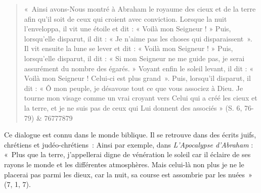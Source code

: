 \begin{quote}
    «~Ainsi avons-Nous montré à Abraham le royaume des cieux et de la terre
afin qu'il soit de ceux qui croient avec conviction. Lorsque la nuit
l'enveloppa, il vit une étoile et dit : « Voilà mon Seigneur ! » Puis,
lorsqu'elle disparut, il dit : « Je n'aime pas les choses qui
disparaissent~». Il vit ensuite la lune se lever et dit : « Voilà mon
Seigneur ! » Puis, lorsqu'elle disparut, il dit : « Si mon Seigneur ne
me guide pas, je serai assurément du nombre des égarés. » Voyant enfin
le soleil levant, il dit : « Voilà mon Seigneur ! Celui-ci est plus
grand~». Puis, lorsqu'il disparut, il dit : « Ô mon peuple, je désavoue
tout ce que vous associez à Dieu. Je tourne mon visage comme un vrai
croyant vers Celui qui a créé les cieux et la terre, et je ne suis pas
de ceux qui Lui donnent des associés » (S. 6, 76-79) & 76777879 \\

\end{quote}
Ce dialogue est connu dans le monde biblique. Il se retrouve dans des
écrits juifs, chrétiens et judéo-chrétiens~: Ainsi par exemple, dans
\emph{L'Apocalypse d'Abraham} : «~Plus que la terre, j'appellerai digne de
vénération le soleil car il éclaire de ses rayons le monde et les
différentes atmosphères. Mais celui-là non plus je ne le placerai pas
parmi les dieux, car la nuit, sa course est assombrie par les nuées~»
(7, 1, 7).

